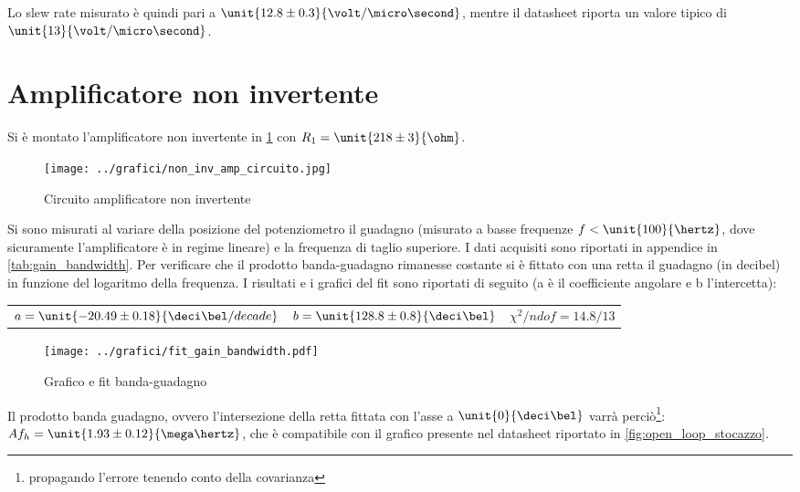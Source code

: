 \documentclass[10pt,a4paper]{article}
\begin{document}
Lo slew rate misurato è quindi pari a $\unit{12.8 \pm 0.3}{\volt/\micro\second}$, mentre il datasheet riporta un valore tipico di $\unit{13}{\volt/\micro\second}$.


\section{Amplificatore non invertente}

Si è montato l'amplificatore non invertente in \figurename{\ref{circuito_non_inv}} con $R_1 = \unit{218 \pm 3}{\ohm}$.

\begin{figure}[h!]
	\centering
	\texttt{[image: ../grafici/non\_inv\_amp\_circuito.jpg]}
	\caption{Circuito amplificatore non invertente}
	\label{circuito_non_inv}
\end{figure}

Si sono misurati al variare della posizione del potenziometro il guadagno (misurato a basse frequenze $f < \unit{100}{\hertz}$, dove sicuramente l'amplificatore è in regime lineare) e la frequenza di taglio superiore. I dati acquisiti sono riportati in appendice in \tablename{\ref{tab:gain_bandwidth}}. Per verificare che il prodotto banda-guadagno rimanesse costante si è fittato con una retta il guadagno (in decibel) in funzione del logaritmo della frequenza. I risultati e i grafici del fit sono riportati di seguito (a è il coefficiente angolare e b l'intercetta):

\begin{table}[H]
	\centering
	\begin{tabular}{ccc}
		$a = \unit{-20.49 \pm 0.18}{\deci\bel /decade}$  &  $b = \unit{128.8 \pm 0.8}{\deci\bel}$ & $\chi^2/ndof= 14.8 / 13$
	\end{tabular}
\end{table}

\begin{figure}[H]
	\centering
	\texttt{[image: ../grafici/fit\_gain\_bandwidth.pdf]}
	\caption{Grafico e fit banda-guadagno}
\end{figure}

Il prodotto banda guadagno, ovvero l'intersezione della retta fittata con l'asse a $\unit{0}{\deci\bel}$ varrà perciò\footnote{propagando l'errore tenendo conto della covarianza}: $Af_h=\unit{1.93\pm0.12}{\mega\hertz}$, che è compatibile con il grafico presente nel datasheet riportato in \figurename{\ref{fig:open_loop_stocazzo}}.
\end{document}
